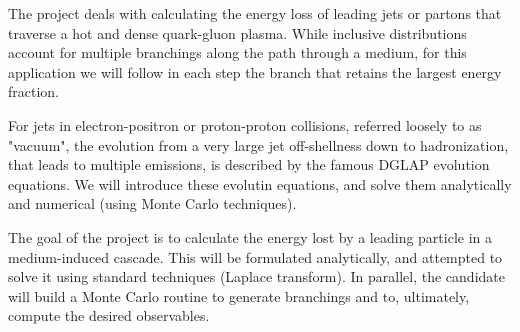 \documentclass[main.tex]{subfiles}
\begin{document}
The project deals with calculating the energy loss of leading jets or partons that traverse a hot and dense quark-gluon plasma. While inclusive distributions account for multiple branchings along the path through a medium, for this application we will follow in each step the branch that retains the largest energy fraction.

For jets in electron-positron or proton-proton collisions, referred loosely to as "vacuum", the evolution from a very large jet off-shellness down to hadronization, that leads to multiple emissions, is described by the famous DGLAP evolution equations. We will introduce these evolutin equations, and solve them analytically and numerical (using Monte Carlo techniques).

The goal of the project is to calculate the energy lost by a leading particle in a medium-induced cascade. This will be formulated analytically, and attempted to solve it using standard techniques (Laplace transform). In parallel, the candidate will build a Monte Carlo routine to generate branchings and to, ultimately, compute the desired observables.
\end{document}
